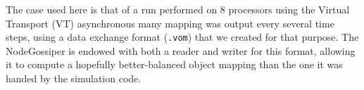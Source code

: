 The case used here is that of a run performed on 8 processors using
the \textsf{Virtual Transport} (\textsf{VT}) asynchronous many 
mapping was output every several time steps, using a data exchange
format (\texttt{.vom}) that we created for that purpose.
The \textsf{NodeGossiper} is endowed with both a reader and writer for
this format, allowing it to compute a hopefully better-balanced object
mapping than the one it was handed by the simulation code.
